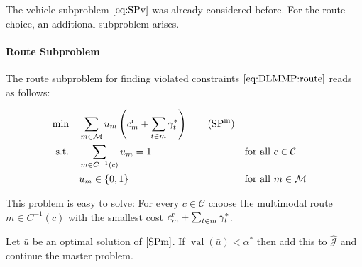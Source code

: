 The vehicle subproblem $\eqref{eq:SPv}$ was already considered before. For the route choice, an additional subproblem arises.

\paragraph{Route Subproblem} \parfill

The route subproblem for finding violated constraints $\eqref{eq:DLMMP:route}$ reads as follows:

\begin{align*}
	\min \quad & \sum_{m\in\mathcal{M}}u_m\left(\croute_m + \sum_{t\in m}\gamma^*_t\right) \tag{$\SPm$} \label{SPm} \\
	\text{s.t.} \quad & \sum_{m\in C^{-1}(c)}u_m = 1 && \text{for all } c\in\mathcal{C} \\
	& u_m\in\{0,1\} && \text{for all } m\in\mathcal{M}
\end{align*}

This problem is easy to solve: For every $c\in\mathcal{C}$ choose the multimodal route $m\in C^{-1}(c)$ with the smallest cost $c^{\operatorname{r}}_m + \sum_{t\in m}\gamma^*_t$. 

Let $\bar{u}$ be an optimal solution of $\eqref{SPm}$. If $\operatorname{val}\left(\bar{u}\right)<\alpha^*$ then add this to $\hat{\mathcal{J}}$ and continue the master problem.